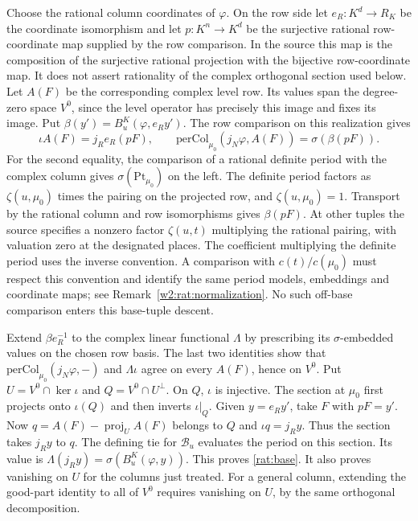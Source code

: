 Choose the rational column coordinates of $\varphi$. On the row side
let $e_R:K^d\longrightarrow R_K$ be the coordinate isomorphism and let
$p:K^n\to K^d$ be the surjective rational row-coordinate map
supplied by the row comparison. In the source this map is the
composition of the surjective rational projection with the bijective
row-coordinate map. It does not assert rationality of the complex
orthogonal section used below. Let $A(F)$ be the corresponding
complex level row. Its values span the degree-zero space $V^0$,
since the level operator has precisely this image and fixes its image.
Put $\beta(y')=B^K_u(\varphi,e_Ry')$. The row comparison on this
realization gives
\[
 \iota A(F)=j_R e_R(pF),\qquad
 \mathrm{perCol}_{\mu_0}(j_N\varphi,A(F))=\sigma(\beta(pF)).
\]
For the second equality, the comparison of a rational definite period
with the complex column gives $\sigma(\mathrm{Pt}_{\mu_0})$ on the left.
The definite period factors as $\zeta(u,\mu_0)$ times the pairing on the
projected row, and $\zeta(u,\mu_0)=1$. Transport by the rational column
and row isomorphisms gives $\beta(pF)$. At other tuples the source
specifies a nonzero factor $\zeta(u,t)$ multiplying the rational pairing,
with valuation zero at the designated places. The coefficient
multiplying the definite period uses the inverse convention.
A comparison with $c(t)/c(\mu_0)$ must respect this convention and
identify the same period models, embeddings and coordinate maps;
see Remark~\ref{w2:rat:normalization}.
No such off-base comparison enters this base-tuple descent.

Extend $\beta e_R^{-1}$ to the complex linear functional $\Lambda$
by prescribing its $\sigma$-embedded values on the chosen row basis.
The last two identities show that $\mathrm{perCol}_{\mu_0}(j_N\varphi,-)$
and $\Lambda\iota$ agree on every $A(F)$, hence on $V^0$. Put
$U=V^0\cap\ker\iota$ and $Q=V^0\cap U^\perp$. On $Q$, $\iota$ is
injective. The section at $\mu_0$ first projects onto $\iota(Q)$ and
then inverts $\iota|_Q$. Given $y=e_R y'$, take $F$ with $pF=y'$.
Now $q=A(F)-\operatorname{proj}_U A(F)$ belongs to $Q$ and
$\iota q=j_R y$. Thus the section takes $j_Ry$ to $q$.
The defining tie for $\mathcal B_u$ evaluates the period on this
section. Its value is $\Lambda(j_R y)=\sigma(B^K_u(\varphi,y))$.
This proves \eqref{rat:base}. It also proves vanishing on $U$ for the
columns just treated. For a general column, extending the good-part
identity to all of $V^0$ requires vanishing on $U$, by the same
orthogonal decomposition.

